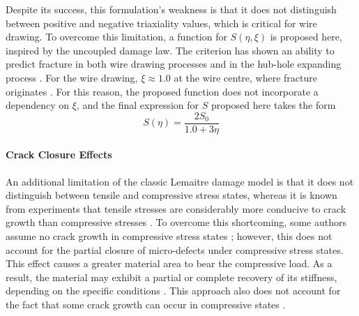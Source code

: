 \documentclass[sn-mathphys,Numbered]{sn-jnl}%
\begin{document}
Despite its success, this formulation's weakness is that it does not distinguish between positive and negative triaxiality values, which is critical for wire drawing.
To overcome this limitation, a function for $S(\eta,\xi)$ is proposed here, inspired by the \citet{ko_prediction_2007} uncoupled damage law.
The \citet{ko_prediction_2007} criterion has shown an ability to predict fracture in both wire drawing processes \cite{roh_process_2021} and in the hub-hole expanding process \cite{ko_prediction_2007}.
For the wire drawing, $\xi\approx1.0$ at the wire centre, where fracture originates \cite{roh_process_2021}.
For this reason, the proposed function does not incorporate a dependency on $\xi$, and the final expression for $S$ proposed here takes the form
\begin{equation} \label{eqn:proposedLemaitre}
	S(\eta) = \frac{2S_0}{1.0+3\eta}
\end{equation}




\paragraph{Crack Closure Effects}

An additional limitation of the classic Lemaitre damage model is that it does not distinguish between tensile and compressive stress states, whereas it is known from experiments that tensile stresses are considerably more conducive to crack growth than compressive stresses \cite{bao_cut-off_2005}.
To overcome this shortcoming, some authors assume no crack growth in compressive stress states \cite{chu_void_1980}; however, this does not account for the partial closure of micro-defects under compressive stress states.
This effect causes a greater material area to bear the compressive load.
As a result, the material may exhibit a partial or complete recovery of its stiffness, depending on the specific conditions \cite{teixeira_ductile_2010}.
This approach also does not account for the fact that some crack growth can occur in compressive states \cite{basic_finite_2005}.
\end{document}
